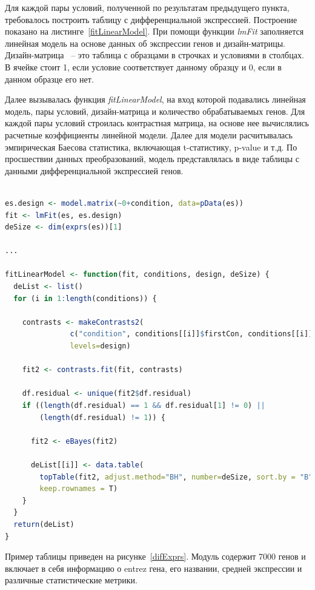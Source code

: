 \documentclass[times,specification,annotation]{itmo-student-thesis}
\begin{document}
Для каждой пары условий, полученной по результатам предыдущего пункта, требовалось построить таблицу с дифференциальной экспрессией. Построение показано на листинге~\ref{fitLinearModel}. При помощи функции \textit{lmFit} заполняется линейная модель на основе данных об экспрессии генов и дизайн-матрицы. Дизайн-матрица ~-- это таблица с образцами в строчках и условиями в столбцах. В ячейке стоит 1, если условие соответствует данному образцу и 0, если в данном образце его нет. 

Далее вызывалась функция \textit{fitLinearModel}, на вход которой подавались линейная модель, пары условий, дизайн-матрица и количество обрабатываемых генов. Для каждой пары условий строилась контрастная матрица, на основе нее вычислялись расчетные коэффициенты линейной модели. Далее для модели расчитывалась эмпирическая Баесова статистика, включающая t-статистику, p-value и т.д. По просшествии данных преобразований, модель представлялась в виде таблицы с данными дифференциальной экспрессией генов.

\begin{lstlisting}[float=!h, caption={Построение модулей генов при помощи дифференциальной экспрессии.}, captionpos=b, label={fitLinearModel}, basicstyle=\footnotesize, language=R]

es.design <- model.matrix(~0+condition, data=pData(es))
fit <- lmFit(es, es.design)
deSize <- dim(exprs(es))[1]

...

fitLinearModel <- function(fit, conditions, design, deSize) {
  deList <- list()
  for (i in 1:length(conditions)) {
    
    contrasts <- makeContrasts2(
               c("condition", conditions[[i]]$firstCon, conditions[[i]]$secondCon), 
               levels=design)
    
    fit2 <- contrasts.fit(fit, contrasts)
    
    df.residual <- unique(fit2$df.residual)
    if ((length(df.residual) == 1 && df.residual[1] != 0) ||
        (length(df.residual) != 1)) {
      
      fit2 <- eBayes(fit2)
      
      deList[[i]] <- data.table(
        topTable(fit2, adjust.method="BH", number=deSize, sort.by = "B"), 
        keep.rownames = T)
    }
  }
  return(deList)
}

\end{lstlisting} 

Пример таблицы приведен на рисунке~\ref{difExprs}. Модуль содержит 7000 генов и включает в себя информацию о entrez гена, его названии, средней экспрессии и различные статистические метрики. 
\end{document}
